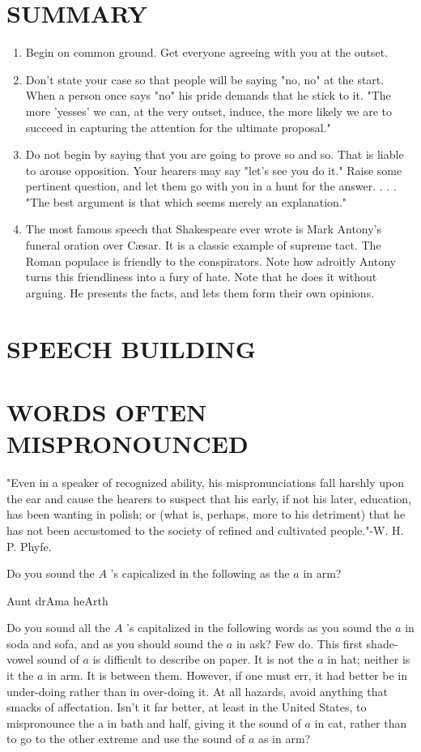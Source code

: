 \documentclass[10pt]{article}
\begin{document}
\section*{SUMMARY}
\begin{enumerate}
  \item Begin on common ground. Get everyone agreeing with you at the outset.
  \item Don't state your case so that people will be saying "no, no" at the start. When a person once says "no" his pride demands that he stick to it. "The more 'yesses' we can, at the very outset, induce, the more likely we are to succeed in capturing the attention for the ultimate proposal."
  \item Do not begin by saying that you are going to prove so and so. That is liable to arouse opposition. Your hearers may say "let's see you do it." Raise some pertinent question, and let them go with you in a hunt for the answer. . . . "The best argument is that which seems merely an explanation."
  \item The most famous speech that Shakespeare ever wrote is Mark Antony's funeral oration over Cæsar. It is a classic example of supreme tact. The Roman populace is friendly to the conspirators. Note how adroitly Antony turns this friendliness into a fury of hate. Note that he does it without arguing. He presents the facts, and lets them form their own opinions.
\end{enumerate}

\section*{SPEECH BUILDING}
\section*{WORDS OFTEN MISPRONOUNCED}
"Even in a speaker of recognized ability, his mispronunciations fall harshly upon the ear and cause the hearers to suspect that his early, if not his later, education, has been wanting in polish; or (what is, perhaps, more to his detriment) that he has not been accustomed to the society of refined and cultivated people."-W. H. P. Phyfe.

Do you sound the $A$ 's capicalized in the following as the $a$ in arm?

\begin{displayquote}
Aunt drAma heArth
\end{displayquote}

Do you sound all the $A$ 's capitalized in the following words as you sound the $a$ in soda and sofa, and as you should sound the $a$ in ask? Few do. This first shade-vowel sound of $a$ is difficult to describe on paper. It is not the $a$ in hat; neither is it the $a$ in arm. It is between them. However, if one must err, it had better be in under-doing rather than in over-doing it. At all hazards, avoid anything that smacks of affectation. Isn't it far better, at least in the United States, to mispronounce the a in bath and half, giving it the sound of $a$ in cat, rather than to go to the other extreme and use the sound of $a$ as in arm?
\end{document}
